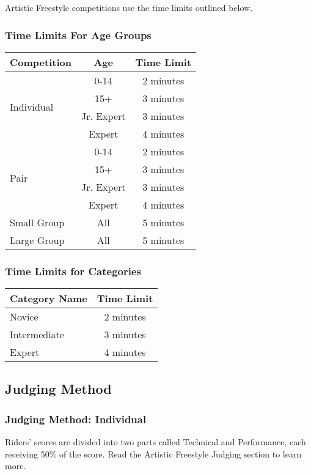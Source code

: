 Artistic Freestyle competitions use the time limits outlined below.

\subsubsection{Time Limits For Age Groups}

\begin{tabular}{|l|c|c|}
\hline
\textbf{Competition} & \textbf{Age} & \textbf{Time Limit} \\
\hline
\multirow{4}{*}{Individual} & 0-14 & 2 minutes \\
\cline{2-3}
& 15+ & 3 minutes \\ 
\cline{2-3}
& Jr. Expert & 3 minutes \\ 
\cline{2-3}
& Expert & 4 minutes \\
\hline
\multirow{4}{*}{Pair} & 0-14 & 2 minutes \\
\cline{2-3}
& 15+ & 3 minutes \\
\cline{2-3}
& Jr. Expert & 3 minutes \\
\cline{2-3}
& Expert & 4 minutes \\
\hline
Small Group & All & 5 minutes \\
\hline
Large Group & All & 5 minutes \\
\hline
\end{tabular}

\subsubsection{Time Limits for Categories}
\begin{tabular}{|l|c|}
\hline
\textbf{Category Name} & \textbf{Time Limit} \\
\hline
Novice & 2 minutes \\
\hline
Intermediate & 3 minutes \\
\hline
Expert & 4 minutes \\
\hline
\end{tabular}
 

\subsection{Judging Method}

\subsubsection{Judging Method: Individual}
Riders' scores are divided into two parts called Technical and Performance, each receiving 50\% of the score.
Read the Artistic Freestyle Judging section to learn more.

